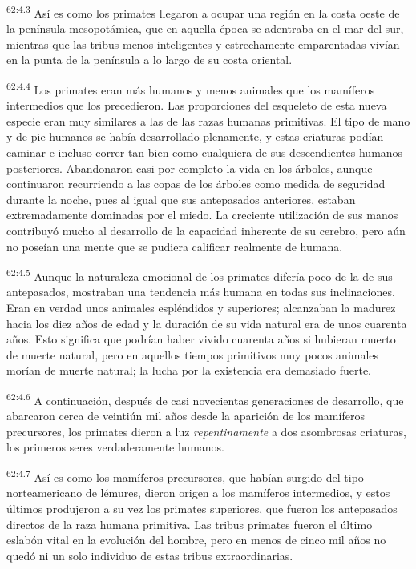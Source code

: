 \par
\textsuperscript{62:4.3} Así es como los primates llegaron a ocupar una región en la costa oeste de la península mesopotámica, que en aquella época se adentraba en el mar del sur, mientras que las tribus menos inteligentes y estrechamente emparentadas vivían en la punta de la península a lo largo de su costa oriental.

\par
\textsuperscript{62:4.4} Los primates eran más humanos y menos animales que los mamíferos intermedios que los precedieron. Las proporciones del esqueleto de esta nueva especie eran muy similares a las de las razas humanas primitivas. El tipo de mano y de pie humanos se había desarrollado plenamente, y estas criaturas podían caminar e incluso correr tan bien como cualquiera de sus descendientes humanos posteriores. Abandonaron casi por completo la vida en los árboles, aunque continuaron recurriendo a las copas de los árboles como medida de seguridad durante la noche, pues al igual que sus antepasados anteriores, estaban extremadamente dominadas por el miedo. La creciente utilización de sus manos contribuyó mucho al desarrollo de la capacidad inherente de su cerebro, pero aún no poseían una mente que se pudiera calificar realmente de humana.

\par
\textsuperscript{62:4.5} Aunque la naturaleza emocional de los primates difería poco de la de sus antepasados, mostraban una tendencia más humana en todas sus inclinaciones. Eran en verdad unos animales espléndidos y superiores; alcanzaban la madurez hacia los diez años de edad y la duración de su vida natural era de unos cuarenta años. Esto significa que podrían haber vivido cuarenta años si hubieran muerto de muerte natural, pero en aquellos tiempos primitivos muy pocos animales morían de muerte natural; la lucha por la existencia era demasiado fuerte.

\par
\textsuperscript{62:4.6} A continuación, después de casi novecientas generaciones de desarrollo, que abarcaron cerca de veintiún mil años desde la aparición de los mamíferos precursores, los primates dieron a luz \textit{repentinamente} a dos asombrosas criaturas, los primeros seres verdaderamente humanos.

\par
\textsuperscript{62:4.7} Así es como los mamíferos precursores, que habían surgido del tipo norteamericano de lémures, dieron origen a los mamíferos intermedios, y estos últimos produjeron a su vez los primates superiores, que fueron los antepasados directos de la raza humana primitiva. Las tribus primates fueron el último eslabón vital en la evolución del hombre, pero en menos de cinco mil años no quedó ni un solo individuo de estas tribus extraordinarias.

